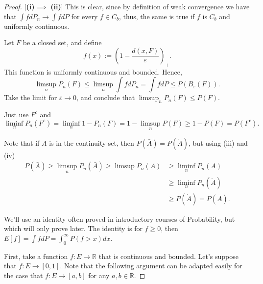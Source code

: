 \begin{proof}

	[\textbf{(i)}$\implies$ \textbf{(ii)}]
	This is clear, since by definition of weak convergence
	we have that $\int f dP_n \to \int f dP$ for every $f \in C_b$, thus,
	the same is true if $f$ is $C_b$ and uniformly continuous.
	\vspace{5mm}

	 Let $F$ be a closed set, and define
	\begin{displaymath}
		f(x) := \left(
		1 - \frac{d(x,F)}{\varepsilon}
		\right)_+.
	\end{displaymath}
	This function is uniformly continuous and bounded. Hence,
	\begin{displaymath}
		\limsup_n P_n(F) \leq \limsup_n \int f dP_n = \int f dP \leq P(B_\varepsilon (F)).
	\end{displaymath}
	Take the limit for $\varepsilon \to 0$, and conclude that $\limsup_n P_n(F) \leq P(F)$.
	\vspace{5mm}

	 Just use $F^c$ and
	\begin{displaymath}
		\liminf_n P_n(F^c) = \liminf_n 1 - P_n(F)= 1 - \limsup_n P(F) \geq 1 - P(F) = P(F^c).
	\end{displaymath}
	\vspace{5mm}

	 Note that if $A$ is
	in the continuity set, then $P(\bar A) = P(\mathring A)$, but using (iii)
	and (iv)
	\begin{align*}
		P(\bar A) \geq \limsup_n P_n(\bar A) \geq \limsup P_n(A)
		 & \geq \liminf_n P_n(A)            \\
		 & \geq \liminf_n P_n(\mathring A)  \\
		 & \geq P(\mathring A) = P(\bar A).
	\end{align*}
	\vspace{5mm}

	 We'll use an identity
	often proved in introductory courses of Probability, but
	which will only prove later. The identity
	is for $f\geq 0 $, then $E[f] = \int f dP = \int_0^\infty P(f>x) dx$.

	First, take a function $f:E \to \mathbb R$ that is continuous and bounded.
	Let's suppose that $f:E \to [0,1]$. Note that the following
	argument can be adapted easily for the case that $f:E \to [a,b]$
	for any $a,b \in \mathbb R$.


\end{proof}
